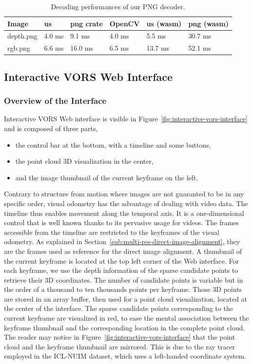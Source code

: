 \begin{table}[ht]
\centering
\begin{tabular}{llllll}
Image & us & png crate & OpenCV & us (wasm) & png (wasm) \\
    \midrule
depth.png & 4.0 ms & 9.1 ms & 4.0 ms & 5.5 ms & 30.7 ms \\
rgb.png & 6.6 ms & 16.0 ms & 6.5 ms & 13.7 ms & 52.1 ms \\
\end{tabular}%
\caption{Decoding performances of our PNG decoder.}%
\label{tab:png-perf}
\end{table}

\subsection{Interactive VORS Web Interface}%
\label{sub:vors-web}

\subsubsection{Overview of the Interface}%

Interactive VORS Web interface is visible in Figure~\ref{fig:interactive-vors-interface}
and is composed of three parts,
\begin{itemize}
\setlength\itemsep{-0.5em}
	\item the control bar at the bottom, with a timeline and some buttons,
	\item the point cloud 3D visualization in the center,
	\item and the image thumbnail of the current keyframe on the left.
\end{itemize}
Contrary to structure from motion where images are not guaranted to be in any specific order,
visual odometry has the advantage of dealing with video data.
The timeline thus enables movement along the temporal axis.
It is a one-dimensional control that is well known thanks to its pervasive usage for videos.
The frames accessible from the timeline are restricted to the keyframes of the visual odometry.
As explained in Section~\ref{sub:multi-res-direct-image-alignment},
they are the frames used as reference for the direct image alignment.
A thumbnail of the current keyframe is located at the top left corner of the Web interface.
For each keyframe, we use the depth information of the sparse candidate points
to retrieve their 3D coordinates.
The number of candidate points is variable but in the order of a thousand
to ten thousands points per keyframe.
Those 3D points are stored in an array buffer,
then used for a point cloud visualization,
located at the center of the interface.
The sparse candidate points corresponding to the current keyframe
are visualized in red, to ease the mental association between the keyframe thumbnail
and the corresponding location in the complete point cloud.
The reader may notice in Figure~\ref{fig:interactive-vors-interface}
that the point cloud and the keyframe thumbnail are mirrored.
This is due to the ray tracer employed in the ICL-NUIM dataset,
which uses a left-handed coordinate system.

